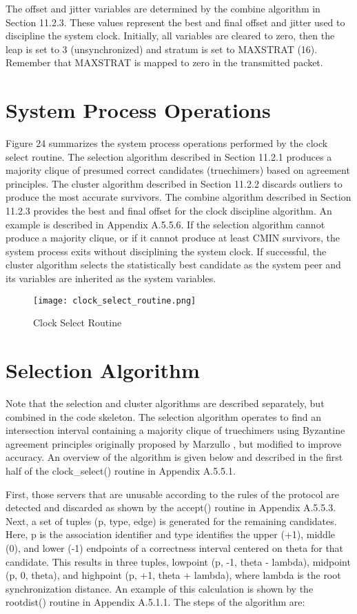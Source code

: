 The offset and jitter variables are determined by the combine
algorithm in Section 11.2.3.  These values represent the best and
final offset and jitter used to discipline the system clock.
Initially, all variables are cleared to zero, then the leap is set to
3 (unsynchronized) and stratum is set to MAXSTRAT (16).  Remember
that MAXSTRAT is mapped to zero in the transmitted packet.

\section{System Process Operations}

Figure 24 summarizes the system process operations performed by the
clock select routine.  The selection algorithm described in
Section 11.2.1 produces a majority clique of presumed correct
candidates (truechimers) based on agreement principles.  The cluster
algorithm described in Section 11.2.2 discards outliers to produce
the most accurate survivors.  The combine algorithm described in
Section 11.2.3 provides the best and final offset for the clock
discipline algorithm.  An example is described in Appendix A.5.5.6.
If the selection algorithm cannot produce a majority clique, or if it
cannot produce at least CMIN survivors, the system process exits
without disciplining the system clock.  If successful, the cluster
algorithm selects the statistically best candidate as the system peer
and its variables are inherited as the system variables.

\begin{figure}
\centering
\texttt{[image: clock\_select\_routine.png]}
\caption{Clock Select Routine}
\label{clock_select_routine}
\end{figure}

\section{Selection Algorithm}

Note that the selection and cluster algorithms are described
separately, but combined in the code skeleton.  The selection
algorithm operates to find an intersection interval containing a
majority clique of truechimers using Byzantine agreement principles
originally proposed by Marzullo \cite{ref6}, but modified to improve
accuracy.  An overview of the algorithm is given below and described
in the first half of the clock\_select() routine in Appendix A.5.5.1.

First, those servers that are unusable according to the rules of the
protocol are detected and discarded as shown by the accept() routine
in Appendix A.5.5.3.  Next, a set of tuples (p, type, edge) is
generated for the remaining candidates.  Here, p is the association
identifier and type identifies the upper (+1), middle (0), and lower
(-1) endpoints of a correctness interval centered on theta for that
candidate.  This results in three tuples, lowpoint (p, -1, theta -
lambda), midpoint (p, 0, theta), and highpoint (p, +1, theta +
lambda), where lambda is the root synchronization distance.  An
example of this calculation is shown by the rootdist() routine in
Appendix A.5.1.1.  The steps of the algorithm are:


